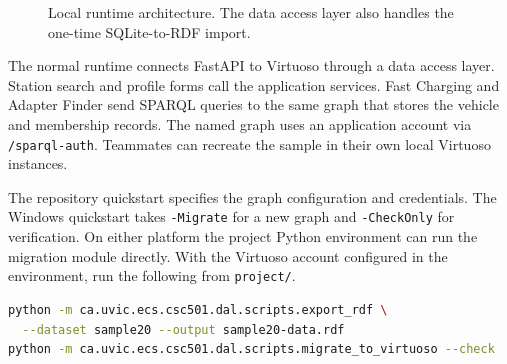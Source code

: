 \documentclass[sigconf,nonacm]{acmart}
\begin{document}
\begin{figure}[H]
\centering
{}
\caption{Local runtime architecture. The data access layer also handles the one-time SQLite-to-RDF import.}
\label{fig:architecture}
\end{figure}

The normal runtime connects FastAPI to Virtuoso through a data access layer. Station search and profile forms call the application services. Fast Charging and Adapter Finder send SPARQL queries to the same graph that stores the vehicle and membership records. The named graph uses an application account via \texttt{/sparql-auth}. Teammates can recreate the sample in their own local Virtuoso instances.

The repository quickstart specifies the graph configuration and credentials. The Windows quickstart takes \texttt{-Migrate} for a new graph and \texttt{-CheckOnly} for verification. On either platform the project Python environment can run the migration module directly. With the Virtuoso account configured in the environment, run the following from \texttt{project/}.

\noindent\begin{minipage}{\columnwidth}
\begin{lstlisting}[language=bash, caption={Base RDF/XML export and verification of an existing application graph.}]
python -m ca.uvic.ecs.csc501.dal.scripts.export_rdf \
  --dataset sample20 --output sample20-data.rdf
python -m ca.uvic.ecs.csc501.dal.scripts.migrate_to_virtuoso --check
\end{lstlisting}
\end{minipage}
\end{document}
